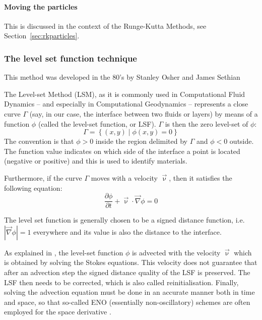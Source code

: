 \paragraph{Moving the particles}

This is discussed in the context of the Runge-Kutta Methods, see Section~\ref{sec:rkparticles}.



\subsubsection{The level set function technique}

This method was developed in the 80's by Stanley Osher and James Sethian \cite{lofo06}

The Level-set Method (LSM), as it is commonly used in Computational Fluid Dynamics -- and especially 
in Computational Geodynamics -- represents a close curve $\Gamma$ (say, in our case, the 
interface between two fluids or layers) by means of a function $\phi$ (called the level-set function, or LSF).
$\Gamma$ is then the zero level-set of $\phi$:
\begin{equation}
\Gamma = \left\{ (x,y) \; |\; \phi(x,y)=0 \right\}
\end{equation}
The convention is that $\phi>0$ inside the region delimited by $\Gamma$ and $\phi<0$ outside.
The function value indicates on which side of the
interface a point is located (negative or positive) and this is
used to identify materials. 

Furthermore, if the curve $\Gamma$ moves with a velocity $\vec \upnu$, 
then it satisfies the following equation:
\begin{equation}
\frac{\partial \phi}{\partial t} + \vec\upnu \cdot \vec\nabla \phi = 0 
\end{equation}

The level set function is generally chosen to
be a signed distance function, i.e. $|\vec\nabla \phi| = 1$ everywhere 
and its value is also the distance to the interface.

As explained in \cite{hitg14}, the level-set function $\phi$ is advected 
with the velocity $\vec\upnu$ which is obtained by solving the Stokes equations.
This velocity does not guarantee that after an advection step the signed 
distance quality of the LSF is preserved. 
The LSF then needs to be corrected, which is also called reinitialisation. 
Finally, solving the advection equation must be done in an accurate manner both in time and space,
so that so-called ENO (essentially non-oscillatory) schemes are often employed for the 
space derivative \cite{ossh91,saev10}.


